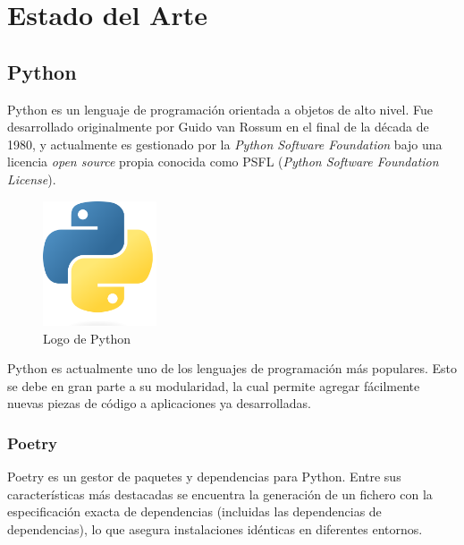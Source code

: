 
\chapter{Estado del Arte} %

\label{Chapter2} %


\section{Python}

Python es un lenguaje de programación orientada a objetos de alto nivel. Fue desarrollado originalmente por Guido van Rossum en el final de la década de 1980, y actualmente es gestionado por la \emph{Python Software Foundation} bajo una licencia \emph{open source} propia conocida como PSFL (\emph{Python Software Foundation License}). \emph{\parencite{Reference1}}

\begin{figure}[ht]
    \centering
    \includegraphics[width=0.3\textwidth]{Figures/python-logo}
    \decoRule
    \caption[Python (Logo)]{Logo de Python \emph{\parencite{Reference2}}}
    \label{fig:python-logo}
\end{figure}

Python es actualmente uno de los lenguajes de programación más populares. Esto se debe en gran parte a su modularidad, la cual permite agregar fácilmente nuevas piezas de código a aplicaciones ya desarrolladas. \emph{\parencite{Reference3}}

\subsection{Poetry}

Poetry es un gestor de paquetes y dependencias para Python. Entre sus características más destacadas se encuentra la generación de un fichero con la especificación exacta de dependencias (incluidas las dependencias de dependencias), lo que asegura instalaciones idénticas en diferentes entornos. \emph{\parencite{Reference6}}


